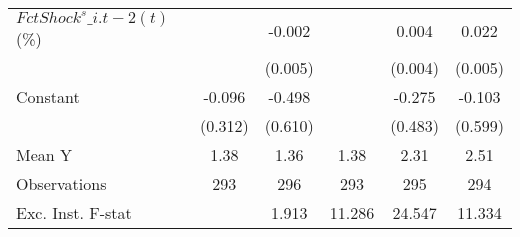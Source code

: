 {\begin{tabular}{l*{5}{c}}
\addlinespace
$ FctShock^s\_{i.t-2}(t)$ (\%)&                     &      -0.002         &                     &       0.004         &       0.022\sym{***}\\
                    &                     &     (0.005)         &                     &     (0.004)         &     (0.005)         \\
\addlinespace
Constant            &      -0.096         &      -0.498         &                     &      -0.275         &      -0.103         \\
                    &     (0.312)         &     (0.610)         &                     &     (0.483)         &     (0.599)         \\
\midrule
Mean Y              &        1.38         &        1.36         &        1.38         &        2.31         &        2.51         \\
Observations        &         293         &         296         &         293         &         295         &         294         \\
Exc. Inst. F-stat   &                     &       1.913         &      11.286         &      24.547         &      11.334         \\
\bottomrule
\end{tabular}
}
